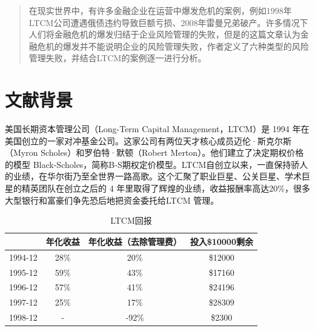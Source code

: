 \begin{abstract}
    在现实世界中，有许多金融企业在运营中爆发危机的案例，例如1998年LTCM公司遭遇俄债违约导致巨额亏损、2008年雷曼兄弟破产。许多情况下人们将金融危机的爆发归结于企业风险管理的失败，但是\citeauthor{stulz2008risk}的这篇文章认为金融危机的爆发并不能说明企业的风险管理失败，作者定义了六种类型的风险管理失败，并结合LTCM的案例逐一进行分析。
\end{abstract}
\section{文献背景}
美国长期资本管理公司（Long-Term Capital Management，LTCM）是 1994 年在美国创立的一家对冲基金公司。这家公司有两位天才核心成员迈伦·斯克尔斯（Myron Scholes）和罗伯特·默顿（Robert Merton）。他们建立了决定期权价格的模型 Black-Scholes，简称B-S期权定价模型。LTCM自创立以来，一直保持骄人的业绩，在华尔街乃至全世界一路高歌。这个汇聚了职业巨星、公关巨星、学术巨星的精英团队在创立之后的 4 年里取得了辉煌的业绩，收益报酬率高达20\%，很多大型银行和富豪们争先恐后地把资金委托给LTCM 管理。
    \begin{table}
        \begin{tabular}{|c|ccc|}
        \hline
                & 年化收益 & 年化收益（去除管理费） & 投入\$10000剩余 \\\hline
        1994-12 & 28\% & 20\%        & \$12000     \\
        1995-12 & 59\% & 43\%        & \$17160     \\
        1996-12 & 57\% & 41\%        & \$24196     \\
        1997-12 & 25\% & 17\%        & \$28309     \\
        1998-12 & -    & -92\%       & \$2300     \\\hline
        \end{tabular}
        \caption{LTCM回报}
    \end{table}

